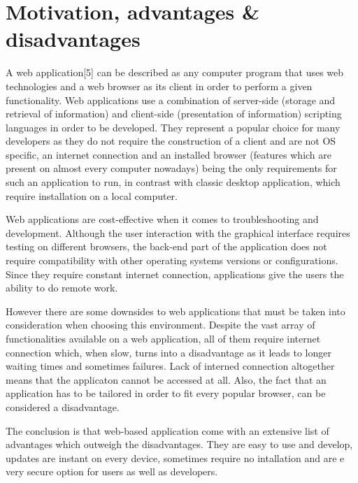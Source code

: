 \documentclass{report}
\begin{document}
\newpage

\chapter {Motivation, advantages \& disadvantages}

A web application[5] can be described as any computer program that uses web technologies and a web browser as its client in order to perform a given functionality. Web applications use a combination of server-side (storage and retrieval of information) and client-side (presentation of information) scripting languages in order to be developed. They represent a popular choice for many developers as they do not require the construction of a client and are not OS specific, an internet connection and an installed browser (features which are present on almost every computer nowadays) being the only requirements for such an application to run, in contrast with classic desktop application, which require installation on a local computer. \par 

Web applications are cost-effective when it comes to troubleshooting and development. Although the user interaction with the graphical interface requires testing on different browsers, the back-end part of the application does not require compatibility with other operating systems versions or configurations. Since they require constant internet connection, applications give the users the ability to do remote work. \par

However there are some downsides to web applications that must be taken into consideration when choosing this environment. Despite the vast array of functionalities available on a web application, all of them require internet connection which, when slow, turns into a disadvantage as it leads to longer waiting times and sometimes failures. Lack of interned connection altogether means that the applicaton cannot be accessed at all. Also, the fact that an application has to be tailored in order to fit every popular browser, can be considered a disadvantage. \par

The conclusion is that web-based application come with an extensive list of advantages which outweigh the disadvantages. They are easy to use and develop, updates are instant on every device, sometimes require no intallation and are e very secure option for users as well as developers. \par
\end{document}
